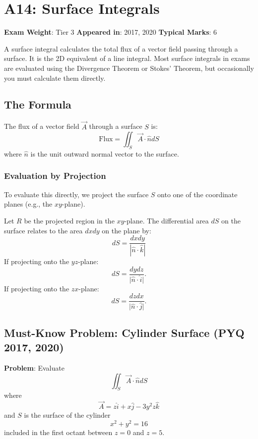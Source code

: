 \documentclass[
]{article}
\renewenvironment{quote}
  {\begin{tcolorbox}[
     colback=calloutbg,
     colframe=calloutframe,
     colupper=callouttext,
     arc=3pt,
     boxrule=0.5pt,
     leftrule=0.5pt,
     borderline west={3pt}{0pt}{calloutaccent},
     left=8pt,
     right=8pt,
     top=6pt,
     bottom=6pt
   ]}
  {\end{tcolorbox}}
\begin{document}
\section{A14: Surface Integrals}\label{a14-surface-integrals}

\begin{quote}
\textbf{Exam Weight}: Tier 3 \textbar{} \textbf{Appeared in}: 2017, 2020
\textbar{} \textbf{Typical Marks}: 6
\end{quote}

A surface integral calculates the total flux of a vector field passing
through a surface. It is the 2D equivalent of a line integral. Most
surface integrals in exams are evaluated using the Divergence Theorem or
Stokes' Theorem, but occasionally you must calculate them directly.

\subsection{The Formula}\label{the-formula}

The flux of a vector field \(\vec{A}\) through a surface \(S\) is:
\[
\text{Flux} = \iint_S \vec{A} \cdot \hat{n} dS
\]
where \(\hat{n}\) is the unit outward normal vector to the surface.

\subsubsection{Evaluation by Projection}\label{evaluation-by-projection}

To evaluate this directly, we project the surface \(S\) onto one of the
coordinate planes (e.g., the \(xy\)-plane).

Let \(R\) be the projected region in the \(xy\)-plane. The differential
area \(dS\) on the surface relates to the area \(dx dy\) on the plane
by:
\[
dS = \frac{dx dy}{|\hat{n} \cdot \hat{k}|}
\]
If projecting onto the \(yz\)-plane:
\[
dS = \frac{dy dz}{\lvert \hat{n} \cdot \hat{i} \rvert}.
\]
If projecting onto the \(zx\)-plane:
\[
dS = \frac{dz dx}{\lvert \hat{n} \cdot \hat{j} \rvert}.
\]

\subsection{Must-Know Problem: Cylinder Surface (PYQ 2017,
2020)}\label{must-know-problem-cylinder-surface-pyq-2017-2020}

\textbf{Problem}: Evaluate
\[
\iint_S \vec{A} \cdot \hat{n} dS
\]
where
\[
\vec{A} = z\hat{i} + x\hat{j} - 3y^2z\hat{k}
\]
and \(S\) is the surface of the cylinder
\[
x^2 + y^2 = 16
\]
included in the first octant between \(z=0\) and \(z=5\).
\end{document}
